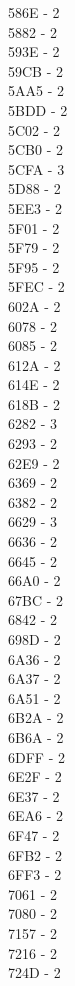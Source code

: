 \documentclass[10pt,letterpaper]{article}
\begin{document}
586E -  2\\
5882 -  2\\
593E -  2\\
59CB -  2\\
5AA5 -  2\\
5BDD -  2\\
5C02 -  2\\
5CB0 -  2\\
5CFA -  3\\
5D88 -  2\\
5EE3 -  2\\
5F01 -  2\\
5F79 -  2\\
5F95 -  2\\
5FEC -  2\\
602A -  2\\
6078 -  2\\
6085 -  2\\
612A -  2\\
614E -  2\\
618B -  2\\
6282 -  3\\
6293 -  2\\
62E9 -  2\\
6369 -  2\\
6382 -  2\\
6629 -  3\\
6636 -  2\\
6645 -  2\\
66A0 -  2\\
67BC -  2\\
6842 -  2\\
698D -  2\\
6A36 -  2\\
6A37 -  2\\
6A51 -  2\\
6B2A -  2\\
6B6A -  2\\
6DFF -  2\\
6E2F -  2\\
6E37 -  2\\
6EA6 -  2\\
6F47 -  2\\
6FB2 -  2\\
6FF3 -  2\\
7061 -  2\\
7080 -  2\\
7157 -  2\\
7216 -  2\\
724D -  2\\
\end{document}
